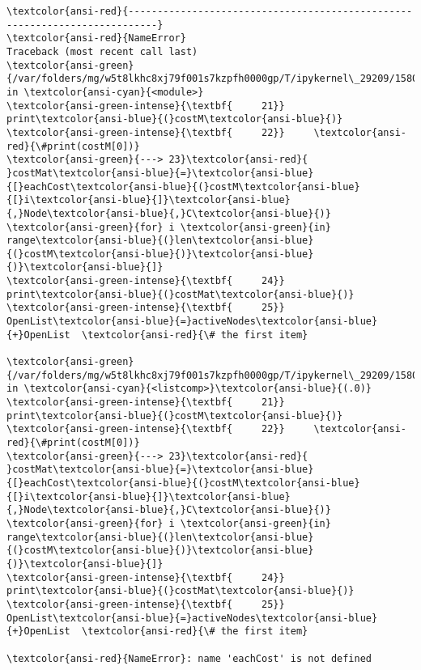 \documentclass[11pt]{article}
\begin{document}
    \begin{Verbatim}[commandchars=\\\{\}, frame=single, framerule=2mm, rulecolor=\color{outerrorbackground}]
\textcolor{ansi-red}{---------------------------------------------------------------------------}
\textcolor{ansi-red}{NameError}                                 Traceback (most recent call last)
\textcolor{ansi-green}{/var/folders/mg/w5t8lkhc8xj79f001s7kzpfh0000gp/T/ipykernel\_29209/1580446706.py} in \textcolor{ansi-cyan}{<module>}
\textcolor{ansi-green-intense}{\textbf{     21}}     print\textcolor{ansi-blue}{(}costM\textcolor{ansi-blue}{)}
\textcolor{ansi-green-intense}{\textbf{     22}}     \textcolor{ansi-red}{\#print(costM[0])}
\textcolor{ansi-green}{---> 23}\textcolor{ansi-red}{     }costMat\textcolor{ansi-blue}{=}\textcolor{ansi-blue}{[}eachCost\textcolor{ansi-blue}{(}costM\textcolor{ansi-blue}{[}i\textcolor{ansi-blue}{]}\textcolor{ansi-blue}{,}Node\textcolor{ansi-blue}{,}C\textcolor{ansi-blue}{)} \textcolor{ansi-green}{for} i \textcolor{ansi-green}{in} range\textcolor{ansi-blue}{(}len\textcolor{ansi-blue}{(}costM\textcolor{ansi-blue}{)}\textcolor{ansi-blue}{)}\textcolor{ansi-blue}{]}
\textcolor{ansi-green-intense}{\textbf{     24}}     print\textcolor{ansi-blue}{(}costMat\textcolor{ansi-blue}{)}
\textcolor{ansi-green-intense}{\textbf{     25}}     OpenList\textcolor{ansi-blue}{=}activeNodes\textcolor{ansi-blue}{+}OpenList  \textcolor{ansi-red}{\# the first item}

\textcolor{ansi-green}{/var/folders/mg/w5t8lkhc8xj79f001s7kzpfh0000gp/T/ipykernel\_29209/1580446706.py} in \textcolor{ansi-cyan}{<listcomp>}\textcolor{ansi-blue}{(.0)}
\textcolor{ansi-green-intense}{\textbf{     21}}     print\textcolor{ansi-blue}{(}costM\textcolor{ansi-blue}{)}
\textcolor{ansi-green-intense}{\textbf{     22}}     \textcolor{ansi-red}{\#print(costM[0])}
\textcolor{ansi-green}{---> 23}\textcolor{ansi-red}{     }costMat\textcolor{ansi-blue}{=}\textcolor{ansi-blue}{[}eachCost\textcolor{ansi-blue}{(}costM\textcolor{ansi-blue}{[}i\textcolor{ansi-blue}{]}\textcolor{ansi-blue}{,}Node\textcolor{ansi-blue}{,}C\textcolor{ansi-blue}{)} \textcolor{ansi-green}{for} i \textcolor{ansi-green}{in} range\textcolor{ansi-blue}{(}len\textcolor{ansi-blue}{(}costM\textcolor{ansi-blue}{)}\textcolor{ansi-blue}{)}\textcolor{ansi-blue}{]}
\textcolor{ansi-green-intense}{\textbf{     24}}     print\textcolor{ansi-blue}{(}costMat\textcolor{ansi-blue}{)}
\textcolor{ansi-green-intense}{\textbf{     25}}     OpenList\textcolor{ansi-blue}{=}activeNodes\textcolor{ansi-blue}{+}OpenList  \textcolor{ansi-red}{\# the first item}

\textcolor{ansi-red}{NameError}: name 'eachCost' is not defined
    \end{Verbatim}
\end{document}
